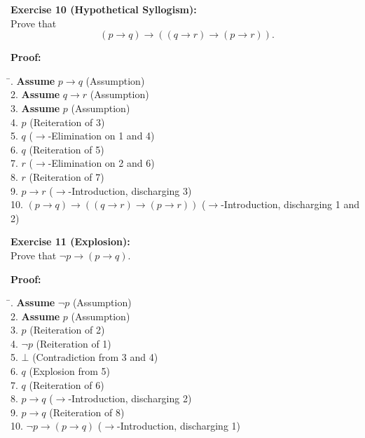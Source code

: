 \documentclass[12pt]{article}
\begin{document}
\bigskip
\textbf{Exercise 10 (Hypothetical Syllogism):}\\[0.3em]
Prove that 
\[
(p\to q)\to ((q\to r)\to (p\to r)).
\]

\textbf{Proof:}
\begin{tabbing}
\hspace*{2cm}\= . \quad \textbf{Assume } \(p\to q\) \quad \quad (Assumption)\\[0.5em]
2. \quad \textbf{Assume } \(q\to r\) \quad \quad (Assumption)\\[0.5em]
3. \quad \textbf{Assume } \(p\) \quad \quad \quad (Assumption)\\[0.5em]
4. \quad \(p\) \quad \quad \quad (Reiteration of 3)\\[0.5em]
5. \quad \(q\) \quad \quad \quad (\(\to\)-Elimination on 1 and 4)\\[0.5em]
6. \quad \(q\) \quad \quad \quad (Reiteration of 5)\\[0.5em]
7. \quad \(r\) \quad \quad \quad (\(\to\)-Elimination on 2 and 6)\\[0.5em]
8. \quad \(r\) \quad \quad \quad (Reiteration of 7)\\[0.5em]
9. \quad \(p\to r\) \quad \quad (\(\to\)-Introduction, discharging 3)\\[0.5em]
10. \quad \((p\to q)\to ((q\to r)\to (p\to r))\) \quad (\(\to\)-Introduction, discharging 1 and 2)
\end{tabbing}

\bigskip
\textbf{Exercise 11 (Explosion):}\\[0.3em]
Prove that \(\lnot p\to (p\to q)\).

\textbf{Proof:}
\begin{tabbing}
\hspace*{2cm}\= . \quad \textbf{Assume } \(\lnot p\) \quad \quad (Assumption)\\[0.5em]
2. \quad \textbf{Assume } \(p\) \quad \quad \quad (Assumption)\\[0.5em]
3. \quad \(p\) \quad \quad \quad (Reiteration of 2)\\[0.5em]
4. \quad \(\lnot p\) \quad \quad (Reiteration of 1)\\[0.5em]
5. \quad \(\bot\) \quad \quad (Contradiction from 3 and 4)\\[0.5em]
6. \quad \(q\) \quad \quad \quad (Explosion from 5)\\[0.5em]
7. \quad \(q\) \quad \quad \quad (Reiteration of 6)\\[0.5em]
8. \quad \(p\to q\) \quad \quad (\(\to\)-Introduction, discharging 2)\\[0.5em]
9. \quad \(p\to q\) \quad \quad (Reiteration of 8)\\[0.5em]
10. \quad \(\lnot p\to (p\to q)\) \quad (\(\to\)-Introduction, discharging 1)
\end{tabbing}
\end{document}
